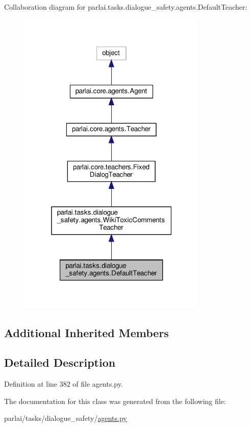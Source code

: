 Collaboration diagram for parlai.\+tasks.\+dialogue\+\_\+safety.\+agents.\+Default\+Teacher\+:\nopagebreak
\begin{figure}[H]
\begin{center}
\leavevmode
\includegraphics[width=256pt]{d3/d28/classparlai_1_1tasks_1_1dialogue__safety_1_1agents_1_1DefaultTeacher__coll__graph}
\end{center}
\end{figure}
\subsection*{Additional Inherited Members}


\subsection{Detailed Description}


Definition at line 382 of file agents.\+py.



The documentation for this class was generated from the following file\+:\begin{DoxyCompactItemize}
\item 
parlai/tasks/dialogue\+\_\+safety/\hyperlink{parlai_2tasks_2dialogue__safety_2agents_8py}{agents.\+py}\end{DoxyCompactItemize}
